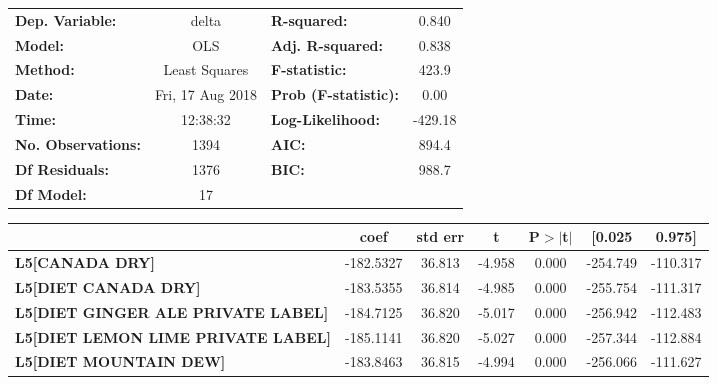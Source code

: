 \begin{center}
\begin{tabular}{lclc}
\toprule
\textbf{Dep. Variable:}                    &      delta       & \textbf{  R-squared:         } &     0.840   \\
\textbf{Model:}                            &       OLS        & \textbf{  Adj. R-squared:    } &     0.838   \\
\textbf{Method:}                           &  Least Squares   & \textbf{  F-statistic:       } &     423.9   \\
\textbf{Date:}                             & Fri, 17 Aug 2018 & \textbf{  Prob (F-statistic):} &     0.00    \\
\textbf{Time:}                             &     12:38:32     & \textbf{  Log-Likelihood:    } &   -429.18   \\
\textbf{No. Observations:}                 &        1394      & \textbf{  AIC:               } &     894.4   \\
\textbf{Df Residuals:}                     &        1376      & \textbf{  BIC:               } &     988.7   \\
\textbf{Df Model:}                         &          17      & \textbf{                     } &             \\
\bottomrule
\end{tabular}
\begin{tabular}{lcccccc}
                                           & \textbf{coef} & \textbf{std err} & \textbf{t} & \textbf{P$>$$|$t$|$} & \textbf{[0.025} & \textbf{0.975]}  \\
\midrule
\textbf{L5[CANADA DRY]}                    &    -182.5327  &       36.813     &    -4.958  &         0.000        &     -254.749    &     -110.317     \\
\textbf{L5[DIET CANADA DRY]}               &    -183.5355  &       36.814     &    -4.985  &         0.000        &     -255.754    &     -111.317     \\
\textbf{L5[DIET GINGER ALE PRIVATE LABEL]} &    -184.7125  &       36.820     &    -5.017  &         0.000        &     -256.942    &     -112.483     \\
\textbf{L5[DIET LEMON LIME PRIVATE LABEL]} &    -185.1141  &       36.820     &    -5.027  &         0.000        &     -257.344    &     -112.884     \\
\textbf{L5[DIET MOUNTAIN DEW]}             &    -183.8463  &       36.815     &    -4.994  &         0.000        &     -256.066    &     -111.627     \\

\end{tabular}
\end{center}
